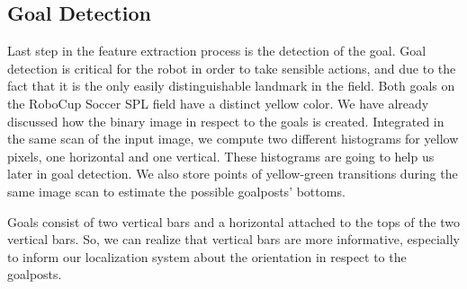 \documentclass[	DIV=calc,%
							paper=a4,%
							fontsize=9pt,%
							twocolumn]{scrartcl}	 					%
\begin{document}
\subsection{Goal Detection}
Last step in the feature extraction process is the detection of the goal. Goal detection is critical for the robot in order to take sensible actions, and due to the fact that it is the only easily distinguishable landmark in the field. Both goals on the RoboCup Soccer SPL field have a distinct yellow color. We have already discussed how the binary image in respect to the goals is created. Integrated in the same scan of the input image, we compute two different histograms for yellow pixels, one horizontal and one vertical. These histograms are going to help us later in goal detection. We also store points of yellow-green transitions during the same image scan to estimate the possible goalposts' bottoms.

Goals consist of two vertical bars and a horizontal attached to the tops of the two vertical bars. So, we can realize that vertical bars are more informative, especially to inform our localization system about the orientation in respect to the goalposts.
\end{document}
